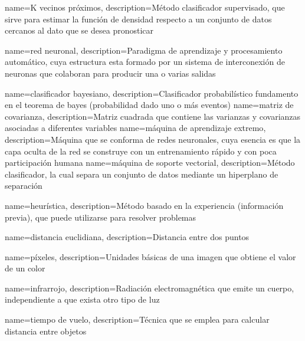  {
 name={K vecinos pr\'oximos},
 description={M\'etodo clasificador supervisado, que sirve para estimar la funci\'on de densidad respecto a un conjunto de datos cercanos al dato que se desea pronosticar}
 } 
 
 {
 name={red neuronal},
 description={Paradigma de aprendizaje y procesamiento autom\'atico, cuya estructura esta formado por un sistema de interconexi\'on de neuronas que colaboran para producir una o varias salidas}
 }
 
 {
 name={clasificador bayesiano},
 description={Clasificador probabil\'istico fundamento en el teorema de bayes (probabilidad dado uno o m\'as eventos)}
 }
 {
 name={matriz de covarianza},
 description={Matriz cuadrada que contiene las varianzas y covarianzas asociadas a diferentes variables}
 } 
 {
 name={m\'aquina de aprendizaje extremo},
 description={M\'aquina que se conforma de redes neuronales, cuya esencia es que la capa oculta de la red se construye con un entrenamiento r\'apido y con poca participaci\'on humana}
 }  
 {
 name={m\'aquina de soporte vectorial},
 description={M\'etodo clasificador, la cual separa un conjunto de datos mediante un hiperplano de separaci\'on}
 }
 
 {
 name={heur\'istica},
 description={M\'etodo basado en la experiencia (informaci\'on previa), que puede utilizarse para resolver problemas }
 }

 {	
 name={distancia euclidiana},
 description={Distancia entre dos puntos}
 }
 
 
 {
 name={p\'ixeles},
 description={Unidades b\'asicas de una imagen que obtiene el valor de un color}
 }
 
 {
 name={infrarrojo},
 description={Radiaci\'on electromagn\'etica que emite un cuerpo, independiente a que exista otro tipo de luz}
 }
 
 {
 name={tiempo de vuelo},
 description={T\'ecnica que se emplea para calcular distancia entre objetos}
 }